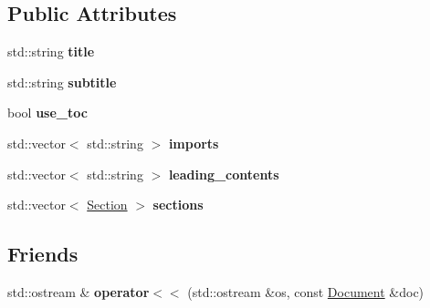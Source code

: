 \subsection*{\-Public \-Attributes}
\begin{DoxyCompactItemize}
\item 
\hypertarget{classlatex_1_1doc_1_1Document_ae669c421fa782997eae2aed024d7fc53}{std\-::string {\bfseries title}}\label{classlatex_1_1doc_1_1Document_ae669c421fa782997eae2aed024d7fc53}

\item 
\hypertarget{classlatex_1_1doc_1_1Document_a966c4725ea244d9ac8a40335202cb499}{std\-::string {\bfseries subtitle}}\label{classlatex_1_1doc_1_1Document_a966c4725ea244d9ac8a40335202cb499}

\item 
\hypertarget{classlatex_1_1doc_1_1Document_ab7d78e94c5883a7e7adcfa141039d128}{bool {\bfseries use\-\_\-toc}}\label{classlatex_1_1doc_1_1Document_ab7d78e94c5883a7e7adcfa141039d128}

\item 
\hypertarget{classlatex_1_1doc_1_1Document_aa6f47f638c00b57aaed3fca96a7eeab8}{std\-::vector$<$ std\-::string $>$ {\bfseries imports}}\label{classlatex_1_1doc_1_1Document_aa6f47f638c00b57aaed3fca96a7eeab8}

\item 
\hypertarget{classlatex_1_1doc_1_1Document_a69c709a155dcf20df20a353b0d2ec245}{std\-::vector$<$ std\-::string $>$ {\bfseries leading\-\_\-contents}}\label{classlatex_1_1doc_1_1Document_a69c709a155dcf20df20a353b0d2ec245}

\item 
\hypertarget{classlatex_1_1doc_1_1Document_a504d1c3f8c3d3492a13bfb0c249f699f}{std\-::vector$<$ \hyperlink{classlatex_1_1doc_1_1Section}{\-Section} $>$ {\bfseries sections}}\label{classlatex_1_1doc_1_1Document_a504d1c3f8c3d3492a13bfb0c249f699f}

\end{DoxyCompactItemize}
\subsection*{\-Friends}
\begin{DoxyCompactItemize}
\item 
\hypertarget{classlatex_1_1doc_1_1Document_a278308e5ad27667f48b2daf57dd1b254}{std\-::ostream \& {\bfseries operator$<$$<$} (std\-::ostream \&os, const \hyperlink{classlatex_1_1doc_1_1Document}{\-Document} \&doc)}\label{classlatex_1_1doc_1_1Document_a278308e5ad27667f48b2daf57dd1b254}

\end{DoxyCompactItemize}


